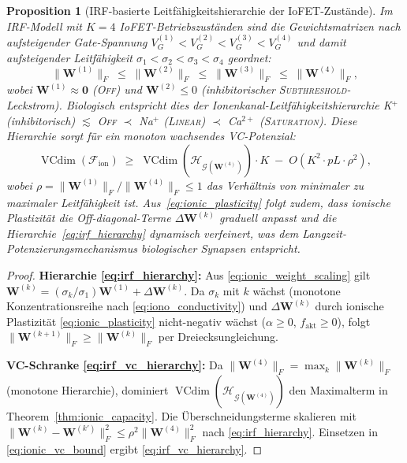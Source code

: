 ﻿\documentclass[12pt, a4paper, openany]{report}
\newtheorem{proposition}[theorem]{Proposition}
\newcommand{\calG}{\mathcal{G}}
\newcommand{\calH}{\mathcal{H}}
\newcommand{\calF}{\mathcal{F}}
\DeclareMathOperator{\VC}{VCdim}
\begin{document}
\begin{proposition}[IRF-basierte Leitfähigkeitshierarchie der IoFET-Zustände]
\label{prop:ionic_hierarchy}
Im IRF-Modell mit $K=4$ IoFET-Betriebszuständen sind die Gewichtsmatrizen
nach aufsteigender Gate-Spannung $V_G^{(1)} < V_G^{(2)} < V_G^{(3)} < V_G^{(4)}$
und damit aufsteigender Leitfähigkeit $\sigma_1 < \sigma_2 < \sigma_3 < \sigma_4$
geordnet:
\begin{equation}
  \label{eq:irf_hierarchy}
  \|\bm{W}^{(1)}\|_F \;\leq\; \|\bm{W}^{(2)}\|_F \;\leq\;
  \|\bm{W}^{(3)}\|_F \;\leq\; \|\bm{W}^{(4)}\|_F,
\end{equation}
wobei $\bm{W}^{(1)} \approx \bm{0}$ (\textsc{Off}) und $\bm{W}^{(2)} \leq 0$
(inhibitorischer \textsc{Subthreshold}-Leckstrom).  Biologisch entspricht
dies der Ionenkanal-Leitfähigkeitshierarchie
K$^+$ (inhibitorisch) $\lesssim$ \textsc{Off} $\prec$ Na$^+$ (\textsc{Linear})
$\prec$ Ca$^{2+}$ (\textsc{Saturation}).
Diese Hierarchie sorgt für ein monoton wachsendes VC-Potenzial:
\begin{equation}
  \label{eq:irf_vc_hierarchy}
  \VC(\calF_{\mathrm{ion}}) \;\geq\; \VC(\calH_{\calG(\bm{W}^{(4)})}) \cdot K
  \;-\; O(K^2 \cdot p L \cdot \rho^2),
\end{equation}
wobei $\rho = \|\bm{W}^{(1)}\|_F / \|\bm{W}^{(4)}\|_F \leq 1$ das
Verhältnis von minimaler zu maximaler Leitfähigkeit ist.
Aus~\eqref{eq:ionic_plasticity} folgt zudem, dass ionische Plastizität
die Off-diagonal-Terme $\Delta\bm{W}^{(k)}$ graduell anpasst und die
Hierarchie~\eqref{eq:irf_hierarchy} dynamisch verfeinert, was dem
Langzeit-Potenzierungsmechanismus biologischer Synapsen entspricht.
\end{proposition}

\begin{proof}
\textbf{Hierarchie \eqref{eq:irf_hierarchy}:}
Aus \eqref{eq:ionic_weight_scaling} gilt $\bm{W}^{(k)} = (\sigma_k/\sigma_1)
\bm{W}^{(1)} + \Delta\bm{W}^{(k)}$.  Da $\sigma_k$ mit $k$ wächst
(monotone Konzentrationsreihe nach \eqref{eq:iono_conductivity}) und
$\Delta\bm{W}^{(k)}$ durch ionische Plastizität \eqref{eq:ionic_plasticity}
nicht-negativ wächst ($\alpha \geq 0$, $f_\mathrm{akt} \geq 0$), folgt
$\|\bm{W}^{(k+1)}\|_F \geq \|\bm{W}^{(k)}\|_F$ per Dreiecksungleichung.

\textbf{VC-Schranke \eqref{eq:irf_vc_hierarchy}:}
Da $\|\bm{W}^{(4)}\|_F = \max_k \|\bm{W}^{(k)}\|_F$ (monotone Hierarchie),
dominiert $\VC(\calH_{\calG(\bm{W}^{(4)})})$ den Maximalterm in
Theorem~\ref{thm:ionic_capacity}.  Die Überschneidungsterme skalieren
mit $\|\bm{W}^{(k)} - \bm{W}^{(k')}\|_F^2 \leq \rho^2 \|\bm{W}^{(4)}\|_F^2$
nach \eqref{eq:irf_hierarchy}.  Einsetzen in
\eqref{eq:ionic_vc_bound} ergibt \eqref{eq:irf_vc_hierarchy}.
\end{proof}
\end{document}

